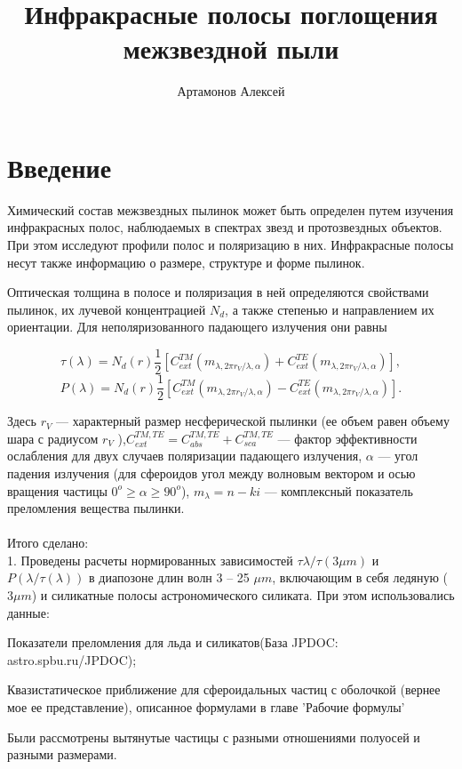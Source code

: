 \documentclass[a4paper,10pt]{article}
\title{\bf{Инфракрасные полосы поглощения межзвездной пыли}}
\author{Артамонов Алексей}
\begin{document}
\maketitle


\section{Введение}
\par Химический состав межзвездных пылинок может быть
определен путем изучения инфракрасных полос,
наблюдаемых в спектрах звезд и протозвездных объектов. При этом
исследуют профили полос и поляризацию в них. Инфракрасные полосы
несут также информацию о размере, структуре и форме пылинок.
\par
Оптическая толщина в полосе и поляризация в ней определяются
свойствами пылинок, их лучевой концентрацией $N_d$,
а также степенью и направлением их ориентации. Для неполяризованного
падающего излучения они равны

$$\tau(\lambda) = N_d(r)\frac{1}{2}[C^{TM}_{ext}(m_{\lambda,2\pi r_V/\lambda,\alpha})+C^{TE}_{ext}(m_{\lambda,2\pi r_V/\lambda,\alpha})],$$
$$P(\lambda) = N_d(r)\frac{1}{2}[C^{TM}_{ext}(m_{\lambda,2\pi r_V/\lambda,\alpha})-C^{TE}_{ext}(m_{\lambda,2\pi r_V/\lambda,\alpha})].$$

Здесь $r_V$ --- характерный размер несферической пылинки (ее объем равен объему шара с радиусом $r_V$
),$C^{TM,TE}_{ext} = C^{TM,TE}_{abs}+C^{TM,TE}_{sca}$ --- фактор эффективности ослабления для двух
случаев поляризации падающего излучения, $\alpha$ --- угол падения излучения 
(для сфероидов угол между волновым вектором и осью вращения частицы $0^{o}\geq\alpha\geq90^{o}$),
$m_\lambda = n - ki$ --- комплексный показатель преломления вещества пылинки.
\\
\\
Итого сделано:\\
1. Проведены расчеты нормированных зависимостей $\tau{\lambda}/\tau(3\mu m)$ и $P(\lambda/\tau(\lambda))$ 
в диапозоне длин волн 3 -- 25 $\mu m$, включающим в себя ледяную ($3\mu m$) и силикатные полосы астрономического силиката.
При этом использовались данные:
\par Показатели преломления для льда и силикатов(База JPDOC: astro.spbu.ru/JPDOC);
\par Квазистатическое приближение для сфероидальных частиц с оболочкой (вернее мое ее представление), 
описанное формулами в главе 'Рабочие формулы'
\\
\par Были рассмотрены вытянутые частицы с разными отношениями полуосей и разными размерами.
\newpage
\end{document}
